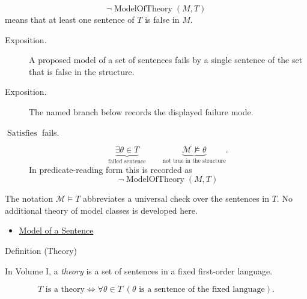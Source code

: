 \begin{remark*}
\[
  \neg\operatorname{ModelOfTheory}(M,T)
\] means that at least one sentence of
\(T\) is false in \(M\).
\end{remark*}

\begin{remark*}
\begin{description}
  \item[Exposition.] A proposed model of a set of sentences fails by a single sentence of the set
that is false in the structure.
\end{description}
\end{remark*}

\begin{remark*}
\begin{description}
  \item[Exposition.] The named branch below records the displayed failure mode.
\item[\(\operatorname{Satisfies}\) fails.] \[
\underbrace{\exists \theta\in T}_{\text{failed sentence}}
\qquad
\underbrace{\mathcal M\not\models\theta}_{\text{not true in the structure}}.
\]
  In predicate-reading form this is recorded as
  \[
    \neg\operatorname{ModelOfTheory}(M,T)
  \]
\end{description}
\end{remark*}

\begin{remark*}[Interpretation]
The notation \(\mathcal M\models T\) abbreviates a universal check over the
sentences in \(T\). No additional theory of model classes is developed here.
\end{remark*}

\begin{dependencies}
\begin{itemize}
  \item \hyperref[def:model]{Model of a Sentence}
\end{itemize}
\end{dependencies}

\begin{definitionbox}{Definition (Theory)}
\begin{definition}[Theory]
\label{def:theory}
In Volume I, a \emph{theory} is a set of sentences in a fixed first-order
language.
\end{definition}
\end{definitionbox}

\begin{remark*}
\[
T \text{ is a theory}
\Longleftrightarrow
\forall \theta\in T\;(\theta \text{ is a sentence of the fixed language}).
\]
\end{remark*}

